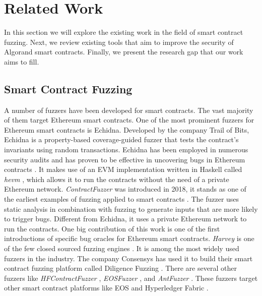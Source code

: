 
\section{Related Work}
In this section we will explore the existing work in the field of smart contract fuzzing. Next, we review existing tools that aim to improve the security of Algorand smart contracts. Finally, we present the research gap that our work aims to fill.

\subsection*{Smart Contract Fuzzing}
A number of fuzzers have been developed for smart contracts.
The vast majority of them target Ethereum smart contracts.
One of the most prominent fuzzers for Ethereum smart contracts is Echidna.
Developed by the company Trail of Bits, Echidna is a property-based coverage-guided fuzzer that tests the contract's invariants using random transactions.
Echidna has been employed in numerous security audits and has proven to be effective in uncovering bugs in Ethereum contracts \cite{grieco_echidna_2020,noauthor_echidna_nodate}.
It makes use of an \acs{EVM} implementation written in Haskell called \textit{hevm} \cite{noauthor_haskell_nodate}, which allows it to run the contracts without the need of a private Ethereum network.
\emph{ContractFuzzer} was introduced in 2018, it stands as one of the earliest examples of fuzzing applied to smart contracts \cite{jiang_contractfuzzer_2018}.
The fuzzer uses static analysis in combination with fuzzing to generate inputs that are more likely to trigger bugs.
Different from Echidna, it uses a private Ethereum network to run the contracts.
One big contribution of this work is one of the first introductions of specific bug oracles for Ethereum smart contracts.
\emph{Harvey} is one of the few closed sourced fuzzing engines \cite{wustholz_harvey_2020}.
It is among the most widely used fuzzers in the industry.
The company Consensys has used it to build their smart contract fuzzing platform called Diligence Fuzzing \cite{consensys_ag_lets_nodate}.
There are several other fuzzers like \emph{HFContractFuzzer} \cite{ding_hfcontractfuzzer_2021}, \emph{EOSFuzzer} \cite{huang_eosfuzzer_2021}, and \emph{AntFuzzer} \cite{zhou_antfuzzer_2022}.
These fuzzers target other smart contract platforms like EOS \cite{noauthor_home_nodate} and Hyperledger Fabric \cite{noauthor_hyperledger_nodate}.

